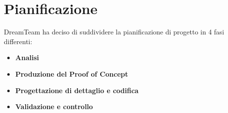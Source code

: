 \section{Pianificazione}
DreamTeam ha deciso di suddividere la pianificazione di progetto in 4 fasi differenti:

\begin{itemize}
\item \textbf{Analisi}
\item \textbf{Produzione del Proof of Concept\glo{}}
\item \textbf{Progettazione di dettaglio e codifica}
\item \textbf{Validazione e controllo}
\end{itemize}









